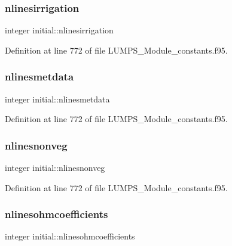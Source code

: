 \subsubsection{\texorpdfstring{nlinesirrigation}{nlinesirrigation}}
{\footnotesize\ttfamily integer initial\+::nlinesirrigation}



Definition at line 772 of file L\+U\+M\+P\+S\+\_\+\+Module\+\_\+constants.\+f95.

\mbox{\label{namespaceinitial_add0284c6ac01e5faf6465d5f7888b82e}} 
\subsubsection{\texorpdfstring{nlinesmetdata}{nlinesmetdata}}
{\footnotesize\ttfamily integer initial\+::nlinesmetdata}



Definition at line 772 of file L\+U\+M\+P\+S\+\_\+\+Module\+\_\+constants.\+f95.

\mbox{\label{namespaceinitial_afaaf24e20f8673a6c00a7b282fdccb59}} 
\subsubsection{\texorpdfstring{nlinesnonveg}{nlinesnonveg}}
{\footnotesize\ttfamily integer initial\+::nlinesnonveg}



Definition at line 772 of file L\+U\+M\+P\+S\+\_\+\+Module\+\_\+constants.\+f95.

\mbox{\label{namespaceinitial_a24ff42afc93b609bca01fc9f83884f41}} 
\subsubsection{\texorpdfstring{nlinesohmcoefficients}{nlinesohmcoefficients}}
{\footnotesize\ttfamily integer initial\+::nlinesohmcoefficients}



